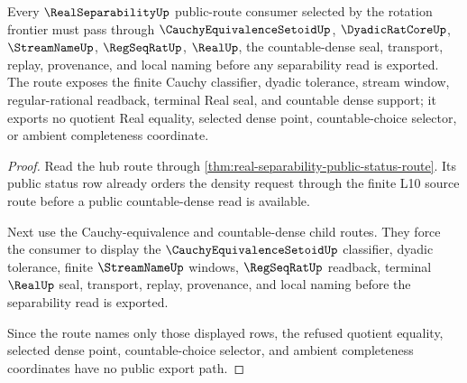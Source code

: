 \begin{theorem}
\label{thm:real-separability-rotation-public-route}
Every $\RealSeparabilityUp$ public-route consumer selected by the rotation frontier must pass through $\CauchyEquivalenceSetoidUp$, $\DyadicRatCoreUp$, $\StreamNameUp$, $\RegSeqRatUp$, $\RealUp$, the countable-dense seal, transport, replay, provenance, and local naming before any separability read is exported. The route exposes the finite Cauchy classifier, dyadic tolerance, stream window, regular-rational readback, terminal Real seal, and countable dense support; it exports no quotient Real equality, selected dense point, countable-choice selector, or ambient completeness coordinate.
\end{theorem}
\begin{proof}
Read the hub route through \autoref{thm:real-separability-public-status-route}. Its public status row already orders the density request through the finite L10 source route before a public countable-dense read is available.

Next use the Cauchy-equivalence and countable-dense child routes. They force the consumer to display the $\CauchyEquivalenceSetoidUp$ classifier, dyadic tolerance, finite $\StreamNameUp$ windows, $\RegSeqRatUp$ readback, terminal $\RealUp$ seal, transport, replay, provenance, and local naming before the separability read is exported.

Since the route names only those displayed rows, the refused quotient equality, selected dense point, countable-choice selector, and ambient completeness coordinates have no public export path.
\end{proof}
